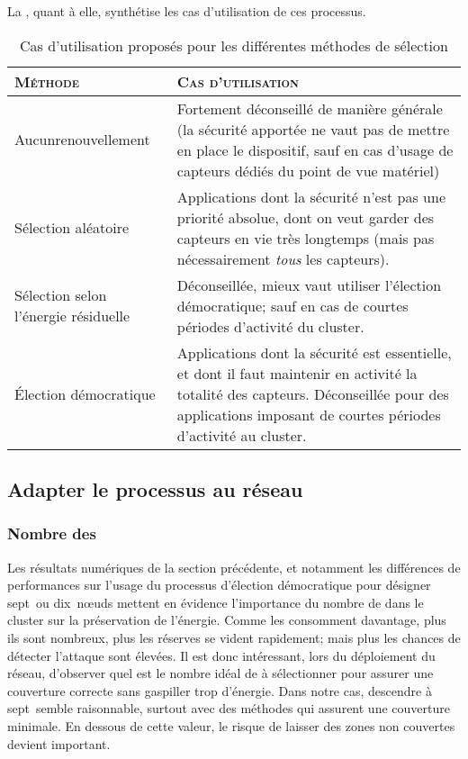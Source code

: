 La , quant à elle, synthétise les cas d'utilisation de ces processus.
\begin{table}[ht]
    \centering
    \caption{Cas d'utilisation proposés pour les différentes méthodes de sélection}\label{sd:table:apps}
    \medskip
    \small
    \begin{tabu}{X[1,c,m] X[2,j,m]}
        \toprule
        \textsc{Méthode} & \textsc{Cas d'utilisation} \\
        \midrule
        Aucun\newline renouvellement
            & Fortement déconseillé de manière générale (la sécurité apportée ne vaut pas de mettre en place le dispositif, sauf en cas d'usage de capteurs dédiés du point de vue matériel)
            \\
        \midrule
        Sélection aléatoire
            & Applications dont la sécurité n'est pas une priorité absolue, dont on veut garder des capteurs en vie très longtemps (mais pas nécessairement \emph{tous} les capteurs).
            \\
        \midrule
        Sélection selon l'énergie résiduelle
            & Déconseillée, mieux vaut utiliser l'élection démocratique; sauf en cas de courtes périodes d'activité du cluster.
            \\
        \midrule
        Élection démocratique
            & Applications dont la sécurité est essentielle, et dont il faut maintenir en activité la totalité des capteurs. Déconseillée pour des applications imposant de courtes périodes d'activité au cluster.
            \\
        \bottomrule
    \end{tabu}
\end{table}

    \subsection{Adapter le processus au réseau}

        \subsubsection{Nombre des \cns}
Les résultats numériques de la section précédente, et notamment les différences de performances sur l'usage du processus d'élection démocratique pour désigner sept~ou dix~nœuds mettent en évidence l'importance du nombre de \cns dans le cluster sur la préservation de l'énergie.
Comme les \cns consomment davantage, plus ils sont nombreux, plus les réserves se vident rapidement; mais plus les chances de détecter l'attaque sont élevées.
Il est donc intéressant, lors du déploiement du réseau, d'observer quel est le nombre idéal de \cns à sélectionner pour assurer une couverture correcte sans gaspiller trop d'énergie.
Dans notre cas, descendre à sept~\cns semble raisonnable, surtout avec des méthodes qui assurent une couverture minimale.
En dessous de cette valeur, le risque de laisser des zones non couvertes devient important.

